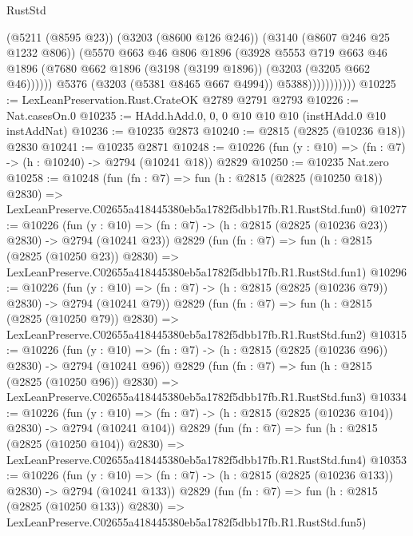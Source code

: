 \begin{lexlean}{RustStd}
\begin{coremodule}
                            (@5211 (@8595 @23))
                            (@3203 (@8600 @126 @246))
                            (@3140 (@8607 @246 @25 @1232 @806))
                            (@5570
                              @663
                              @46
                              @806
                              @1896
                              (@3928
                                @5553
                                @719
                                @663
                                @46
                                @1896
                                (@7680 @662 @1896 (@3198 (@3199 @1896)) (@3203 (@3205 @662 @46))))))
                          @5376
                          (@3203 (@5381 @8465 @667 @4994))
                          @5388)))))))))))
@10225 := LexLeanPreservation.Rust.CrateOK @2789 @2791 @2793
@10226 := Nat.casesOn.{0}
@10235 := HAdd.hAdd.{0, 0, 0} @10 @10 @10 (instHAdd.{0} @10 instAddNat)
@10236 := @10235 @2873
@10240 := @2815 (@2825 (@10236 @18)) @2830
@10241 := @10235 @2871
@10248 := @10226 (fun (y : @10) => (fn : @7) -> (h : @10240) -> @2794 (@10241 @18)) @2829
@10250 := @10235 Nat.zero
@10258 := @10248
    (fun (fn : @7) =>
    fun (h : @2815 (@2825 (@10250 @18)) @2830) =>
    LexLeanPreserve.C02655a418445380eb5a1782f5dbb17fb.R1.RustStd.fun0)
@10277 := @10226
    (fun (y : @10) => (fn : @7) -> (h : @2815 (@2825 (@10236 @23)) @2830) -> @2794 (@10241 @23))
    @2829
    (fun (fn : @7) =>
    fun (h : @2815 (@2825 (@10250 @23)) @2830) =>
    LexLeanPreserve.C02655a418445380eb5a1782f5dbb17fb.R1.RustStd.fun1)
@10296 := @10226
    (fun (y : @10) => (fn : @7) -> (h : @2815 (@2825 (@10236 @79)) @2830) -> @2794 (@10241 @79))
    @2829
    (fun (fn : @7) =>
    fun (h : @2815 (@2825 (@10250 @79)) @2830) =>
    LexLeanPreserve.C02655a418445380eb5a1782f5dbb17fb.R1.RustStd.fun2)
@10315 := @10226
    (fun (y : @10) => (fn : @7) -> (h : @2815 (@2825 (@10236 @96)) @2830) -> @2794 (@10241 @96))
    @2829
    (fun (fn : @7) =>
    fun (h : @2815 (@2825 (@10250 @96)) @2830) =>
    LexLeanPreserve.C02655a418445380eb5a1782f5dbb17fb.R1.RustStd.fun3)
@10334 := @10226
    (fun (y : @10) => (fn : @7) -> (h : @2815 (@2825 (@10236 @104)) @2830) -> @2794 (@10241 @104))
    @2829
    (fun (fn : @7) =>
    fun (h : @2815 (@2825 (@10250 @104)) @2830) =>
    LexLeanPreserve.C02655a418445380eb5a1782f5dbb17fb.R1.RustStd.fun4)
@10353 := @10226
    (fun (y : @10) => (fn : @7) -> (h : @2815 (@2825 (@10236 @133)) @2830) -> @2794 (@10241 @133))
    @2829
    (fun (fn : @7) =>
    fun (h : @2815 (@2825 (@10250 @133)) @2830) =>
    LexLeanPreserve.C02655a418445380eb5a1782f5dbb17fb.R1.RustStd.fun5)

\end{coremodule}
\end{lexlean}
